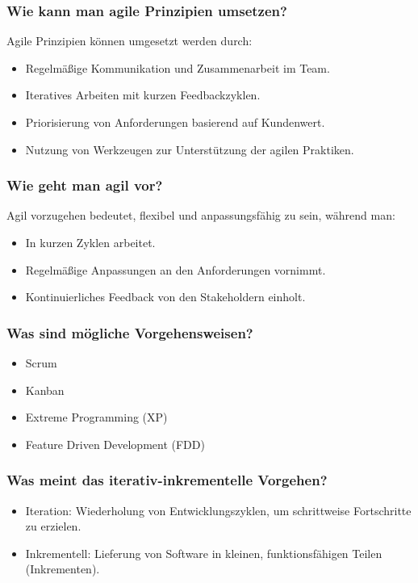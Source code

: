 \documentclass[main.tex]{subfiles}
\begin{document}
\subsubsection*{Wie kann man agile Prinzipien umsetzen?}
Agile Prinzipien können umgesetzt werden durch:
\begin{itemize}
    \item Regelmäßige Kommunikation und Zusammenarbeit im Team.
    \item Iteratives Arbeiten mit kurzen Feedbackzyklen.
    \item Priorisierung von Anforderungen basierend auf Kundenwert.
    \item Nutzung von Werkzeugen zur Unterstützung der agilen Praktiken.
\end{itemize}

\subsubsection*{Wie geht man agil vor?}
Agil vorzugehen bedeutet, flexibel und anpassungsfähig zu sein, während man:
\begin{itemize}
    \item In kurzen Zyklen arbeitet.
    \item Regelmäßige Anpassungen an den Anforderungen vornimmt.
    \item Kontinuierliches Feedback von den Stakeholdern einholt.
\end{itemize}

\subsubsection*{Was sind mögliche Vorgehensweisen?}
\begin{itemize}
    \item Scrum
    \item Kanban
    \item Extreme Programming (XP)
    \item Feature Driven Development (FDD)
\end{itemize}

\subsubsection*{Was meint das iterativ-inkrementelle Vorgehen?}
\begin{itemize}
    \item Iteration: Wiederholung von Entwicklungszyklen, um schrittweise Fortschritte zu erzielen.
    \item Inkrementell: Lieferung von Software in kleinen, funktionsfähigen Teilen (Inkrementen).
\end{itemize}
\end{document}
